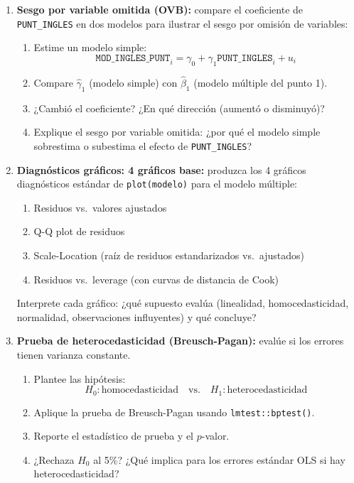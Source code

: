 \documentclass[11pt, a4paper]{article}
\begin{document}
\begin{enumerate}[label=\arabic*)]
  \item \textbf{Sesgo por variable omitida (OVB):} compare el coeficiente de
        \texttt{PUNT\_INGLES} en dos modelos para ilustrar el sesgo por
        omisi\'on de variables:
        \begin{enumerate}[label=\alph*)]
          \item Estime un modelo simple:
                \[
                  \texttt{MOD\_INGLES\_PUNT}_i = \gamma_0 + \gamma_1
                  \texttt{PUNT\_INGLES}_i + u_i
                \]
          \item Compare $\hat{\gamma}_1$ (modelo simple) con
                $\hat{\beta}_1$ (modelo m\'ultiple del punto 1).
          \item ¿Cambi\'o el coeficiente? ¿En qu\'e direcci\'on (aument\'o o
                disminuy\'o)?
          \item Explique el sesgo por variable omitida: ¿por qu\'e el modelo
                simple sobrestima o subestima el efecto de
                \texttt{PUNT\_INGLES}?
        \end{enumerate}

  \item \textbf{Diagn\'osticos gr\'aficos: 4 gr\'aficos base:} produzca los
        4 gr\'aficos diagn\'osticos est\'andar de \texttt{plot(modelo)} para
        el modelo m\'ultiple:
        \begin{enumerate}[label=\alph*)]
          \item Residuos vs.\ valores ajustados
          \item Q-Q plot de residuos
          \item Scale-Location (ra\'iz de residuos estandarizados vs.\
                ajustados)
          \item Residuos vs.\ leverage (con curvas de distancia de Cook)
        \end{enumerate}
        Interprete cada gr\'afico: ¿qu\'e supuesto eval\'ua (linealidad,
        homocedasticidad, normalidad, observaciones influyentes) y qu\'e
        concluye?

  \item \textbf{Prueba de heterocedasticidad (Breusch-Pagan):} eval\'ue si
        los errores tienen varianza constante.
        \begin{enumerate}[label=\alph*)]
          \item Plantee las hip\'otesis:
                \[
                  H_0: \text{homocedasticidad} \quad \text{vs.} \quad
                  H_1: \text{heterocedasticidad}
                \]
          \item Aplique la prueba de Breusch-Pagan usando
                \texttt{lmtest::bptest()}.
          \item Reporte el estad\'istico de prueba y el $p$-valor.
          \item ¿Rechaza $H_0$ al 5\%? ¿Qu\'e implica para los errores
                est\'andar OLS si hay heterocedasticidad?
        \end{enumerate}


\end{enumerate}
\end{document}
